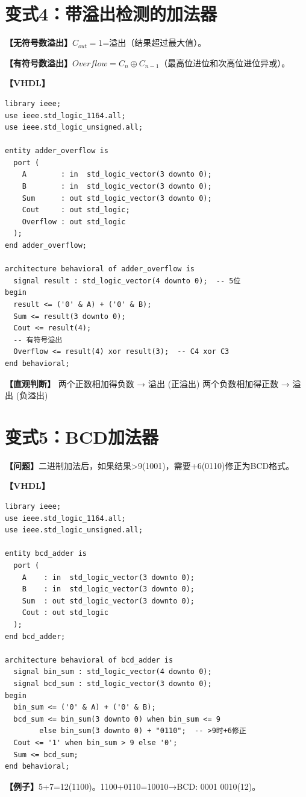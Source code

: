 \section{变式4：带溢出检测的加法器}

\begin{detailbox}[完整教学]
\textbf{【无符号数溢出】}$C_{out}=1$=溢出（结果超过最大值）。

\textbf{【有符号数溢出】}$Overflow = C_n \oplus C_{n-1}$（最高位进位和次高位进位异或）。

\textbf{【VHDL】}
\begin{lstlisting}[caption={带溢出检测的加法器}]
library ieee;
use ieee.std_logic_1164.all;
use ieee.std_logic_unsigned.all;

entity adder_overflow is
  port (
    A        : in  std_logic_vector(3 downto 0);
    B        : in  std_logic_vector(3 downto 0);
    Sum      : out std_logic_vector(3 downto 0);
    Cout     : out std_logic;
    Overflow : out std_logic
  );
end adder_overflow;

architecture behavioral of adder_overflow is
  signal result : std_logic_vector(4 downto 0);  -- 5位
begin
  result <= ('0' & A) + ('0' & B);
  Sum <= result(3 downto 0);
  Cout <= result(4);
  -- 有符号溢出
  Overflow <= result(4) xor result(3);  -- C4 xor C3
end behavioral;
\end{lstlisting}

\textbf{【直观判断】}
两个正数相加得负数 → 溢出 (正溢出)
两个负数相加得正数 → 溢出 (负溢出)
\end{detailbox}


\section{变式5：BCD加法器}

\begin{detailbox}[完整教学]
\textbf{【问题】}二进制加法后，如果结果>9(1001)，需要+6(0110)修正为BCD格式。

\textbf{【VHDL】}
\begin{lstlisting}[caption={BCD加法器完整实现}]
library ieee;
use ieee.std_logic_1164.all;
use ieee.std_logic_unsigned.all;

entity bcd_adder is
  port (
    A    : in  std_logic_vector(3 downto 0);
    B    : in  std_logic_vector(3 downto 0);
    Sum  : out std_logic_vector(3 downto 0);
    Cout : out std_logic
  );
end bcd_adder;

architecture behavioral of bcd_adder is
  signal bin_sum : std_logic_vector(4 downto 0);
  signal bcd_sum : std_logic_vector(3 downto 0);
begin
  bin_sum <= ('0' & A) + ('0' & B);
  bcd_sum <= bin_sum(3 downto 0) when bin_sum <= 9
        else bin_sum(3 downto 0) + "0110";  -- >9时+6修正
  Cout <= '1' when bin_sum > 9 else '0';
  Sum <= bcd_sum;
end behavioral;
\end{lstlisting}

\textbf{【例子】}5+7=12(1100)。1100+0110=10010→BCD: 0001 0010(12)。
\end{detailbox}
